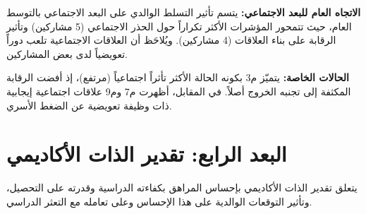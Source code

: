 \documentclass[12pt,oneside]{report}
\begin{document}
\noindent\textbf{الاتجاه العام للبعد الاجتماعي:} يتسم تأثير التسلط الوالدي على البعد الاجتماعي بالتوسط العام، حيث تتمحور المؤشرات الأكثر تكراراً حول الحذر الاجتماعي (5 مشاركين) وتأثير الرقابة على بناء العلاقات (4 مشاركين). ويُلاحَظ أن العلاقات الاجتماعية تلعب دوراً تعويضياً لدى بعض المشاركين.\par
\noindent\textbf{الحالات الخاصة:} يتميّز م3 بكونه الحالة الأكثر تأثراً اجتماعياً (مرتفع)، إذ أفضت الرقابة المكثفة إلى تجنبه الخروج أصلاً. في المقابل، أظهرت م7 وم9 علاقات اجتماعية إيجابية ذات وظيفة تعويضية عن الضغط الأسري.\par
\section{البعد الرابع: تقدير الذات الأكاديمي}
يتعلق تقدير الذات الأكاديمي بإحساس المراهق بكفاءته الدراسية وقدرته على التحصيل، وتأثير التوقعات الوالدية على هذا الإحساس وعلى تعامله مع التعثر الدراسي.
\end{document}
